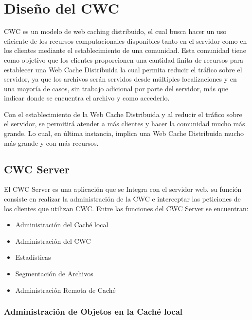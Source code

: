 
\chapter{Diseño del CWC} %

\label{ch:diseno_cwc} %

CWC es un modelo de web caching distribuido, el cual busca hacer un uso eficiente de los recursos computacionales disponibles tanto en el servidor como en los clientes mediante el establecimiento de una comunidad. Esta comunidad tiene como objetivo que los clientes proporcionen una cantidad finita de recursos para establecer una Web Cache Distribuida la cual permita reducir el tráfico sobre el servidor, ya que los archivos serán servidos desde múltiples localizaciones y en una mayoría de casos, sin trabajo adicional por parte del servidor, más que indicar donde se encuentra el archivo y como accederlo. 

Con el establecimiento de la Web Cache Distribuida y al reducir el tráfico sobre el servidor, se permitirá atender a más clientes y hacer la comunidad mucho más grande. Lo cual, en última instancia, implica una Web Cache Distribuida mucho más grande y con más recursos.

\section{CWC Server}

El CWC Server es una aplicación que se Integra con el servidor web, su función consiste en realizar la administración de la CWC e interceptar las peticiones de los clientes que utilizan CWC. Entre las funciones del CWC Server se encuentran: 

\begin{itemize}
\item Administración del Caché local
\item Administración del CWC
\item Estadísticas
\item Segmentación de Archivos
\item Administración Remota de Caché
\end{itemize}


\subsection{Administración de Objetos en la Caché local}

